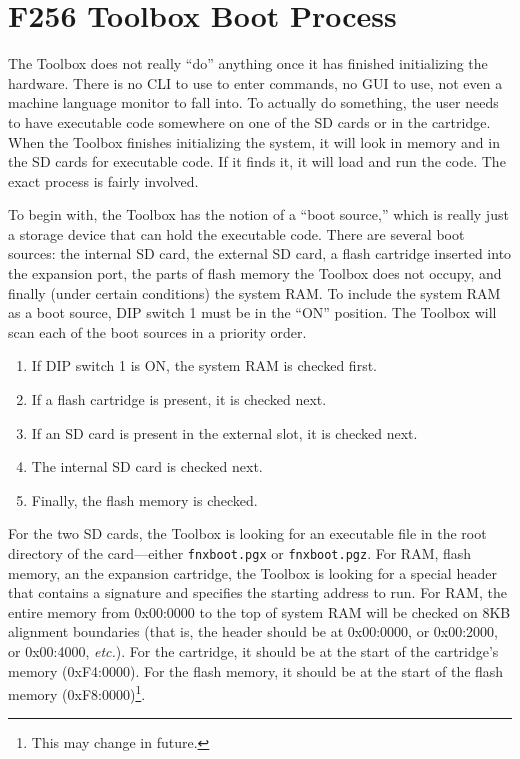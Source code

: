 \chapter{F256 Toolbox Boot Process}
The Toolbox does not really ``do'' anything once it has finished initializing the hardware.
There is no CLI to use to enter commands, no GUI to use, not even a machine language monitor to fall into.
To actually do something, the user needs to have executable code somewhere on one of the SD cards or in
the cartridge.
When the Toolbox finishes initializing the system, it will look in memory and in the SD cards for executable
code. If it finds it, it will load and run the code. The exact process is fairly involved.

To begin with, the Toolbox has the notion of a ``boot source,'' which is really just a storage device that can
hold the executable code. There are several boot sources: the internal SD card, the external SD card, a flash
cartridge inserted into the expansion port, the parts of flash memory the Toolbox does not occupy, and finally
(under certain conditions) the system RAM. To include the system RAM as a boot source, DIP switch 1 must be in
the ``ON'' position. The Toolbox will scan each of the boot sources in a priority order.

\begin{enumerate}
	\item If DIP switch 1 is ON, the system RAM is checked first.
	\item If a flash cartridge is present, it is checked next.
	\item If an SD card is present in the external slot, it is checked next.
	\item The internal SD card is checked next.
	\item Finally, the flash memory is checked.
\end{enumerate}

For the two SD cards, the Toolbox is looking for an executable file in the root directory of the card---either \verb+fnxboot.pgx+
or \verb+fnxboot.pgz+. For RAM, flash memory, an the expansion cartridge, the Toolbox is looking for a special header that contains a signature and specifies the starting address to run. For RAM, the entire memory from 0x00:0000 to the top of system RAM will be checked on 8KB alignment boundaries (that is, the header should be at 0x00:0000, or 0x00:2000, or 0x00:4000, {\it etc.}). For the cartridge, it should be at the start of the cartridge's memory (0xF4:0000). For the flash memory, it should be at the start of the flash memory (0xF8:0000)\footnote{This may change in future.}.

